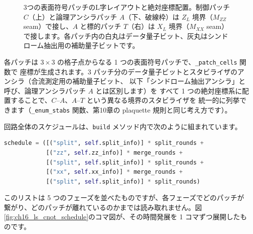 \begin{figure}[htbp]
  \caption{3つの表面符号パッチのL字レイアウトと絶対座標配置。制御パッチ $C$（上）と論理アンシラパッチ $A$（下、破線枠）は $Z_L$ 境界（$M_{ZZ}$ seam）で接し、$A$ と標的パッチ $T$（右）は $X_L$ 境界（$M_{XX}$ seam）で接します。各パッチ内の白丸はデータ量子ビット、灰丸はシンドローム抽出用の補助量子ビットです。}
  \label{fig:ch16_ls_cnot_layout}
\end{figure}

各パッチは $3\times3$ の格子点からなる 1 つの表面符号パッチで、\texttt{\_patch\_cells} 関数で
座標が生成されます。3 パッチ分のデータ量子ビットとスタビライザのアンシラ（合流測定用の補助量子ビット、
以下「シンドローム抽出アンシラ」と呼び、論理アンシラパッチ $A$ とは区別します）を
すべて 1 つの絶対座標系に配置することで、$C$–$A$、$A$–$T$ という異なる境界のスタビライザを
統一的に列挙できます（\texttt{\_enum\_stabs} 関数、第10章の plaquette 規則と同じ考え方です）。

回路全体のスケジュールは、\texttt{build} メソッド内で次のように組まれています。

\begin{lstlisting}[language=Python, caption={src/stages/02\_circuit\_level/src/ftqc/ls\_cnot\_ft.py の merge スケジュール}]
schedule = ([("split", self.split_info)] * split_rounds +
            [("zz", self.zz_info)] * merge_rounds +
            [("split", self.split_info)] * split_rounds +
            [("xx", self.xx_info)] * merge_rounds +
            [("split", self.split_info)] * split_rounds)
\end{lstlisting}

このリストは 5 つのフェーズを並べたものですが、各フェーズでどのパッチが繋がり、どのパッチが離れているのかまでは読み取れません。図\ref{fig:ch16_ls_cnot_schedule}のコマ図が、その時間発展を 1 コマずつ展開したものです。

